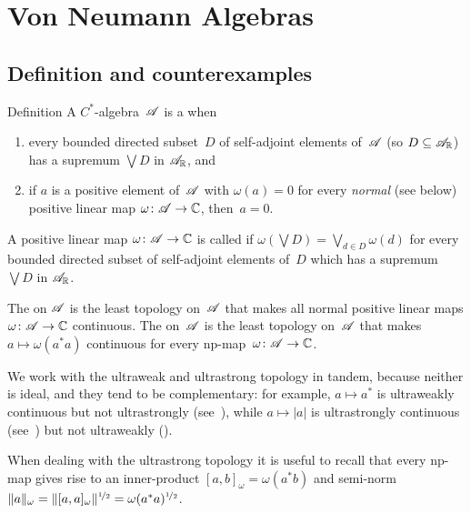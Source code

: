 \documentclass[a]{subfiles}
\begin{document}
\chapter{Von Neumann Algebras}
%
%
\section{Definition and counterexamples}
\begin{parsec}[vna]%
\begin{point}{Definition}%
A $C^*$-algebra~$\mathscr{A}$
is a 
when
\begin{enumerate}
\item
every bounded directed subset~$D$
of self-adjoint elements of~$\mathscr{A}$ (so $D\subseteq \mathscr{A}_{\mathbb{R}}$) 
has a supremum $\bigvee D$ in $\mathscr{A}_{\mathbb{R}}$, and
\item
if $a$ is a positive element of~$\mathscr{A}$
with $\omega(a)=0$ for every \emph{normal} (see below) positive 
linear map $\omega\colon \mathscr{A}\to \mathbb{C}$,
then~$a=0$.
\end{enumerate}
\begin{point}%
A positive linear map $\omega\colon \mathscr{A}\to \mathbb{C}$
is called 
if $\omega(\bigvee D) = \bigvee_{d\in D} \omega(d)$
for every bounded directed subset of self-adjoint elements of~$D$
which has a supremum $\bigvee D$ in $\mathscr{A}_{\mathbb{R}}$.
\end{point}%
\begin{point}%
The  on $\mathscr{A}$
is the least topology on~$\mathscr{A}$
that makes all normal positive linear maps $\omega\colon \mathscr{A}\to \mathbb{C}$
continuous.
The  on~$\mathscr{A}$
is the least topology on~$\mathscr{A}$
that makes $a\mapsto \omega(a^*a)$ continuous
for every np-map~$\omega\colon \mathscr{A}\to \mathbb{C}$.
\end{point}
\end{point}
\begin{point}%
We work with the ultraweak and ultrastrong topology in tandem,
because neither is ideal, and they tend to be complementary:
for example, $a\mapsto a^*$ is ultraweakly continuous
but not ultrastrongly (see~\TODO{}), 
while $a\mapsto \left|a\right|$
is ultrastrongly continuous (see~\TODO{}) but not ultraweakly
(\TODO{}).

When dealing with the ultrastrong topology
it is useful to recall that
every np-map gives rise
to an inner-product $[a,b]_\omega = \omega(a^*b)$
and semi-norm $\|a\|_\omega = \|[a,a]_\omega\|^{\nicefrac{1}{2}}
= \omega(a^*a)^{\nicefrac{1}{2}}$.
\end{point}
\end{parsec}
\end{document}
